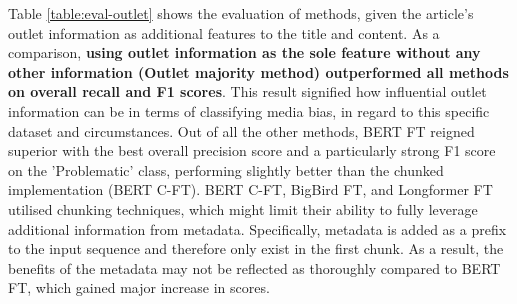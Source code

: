 Table \ref{table:eval-outlet} shows the evaluation of methods, given the article's outlet information as additional features to the title and content. As a comparison, \textbf{using outlet information as the sole feature without any other information (Outlet majority method) outperformed all methods on overall recall and F1 scores}. This result signified how influential outlet information can be in terms of classifying media bias, in regard to this specific dataset and circumstances. Out of all the other methods, BERT FT reigned superior with the best overall precision score and a particularly strong F1 score on the 'Problematic' class, performing slightly better than the chunked implementation (BERT C-FT). BERT C-FT, BigBird FT, and Longformer FT utilised chunking techniques, which might limit their ability to fully leverage additional information from metadata. Specifically, metadata is added as a prefix to the input sequence and therefore only exist in the first chunk. As a result, the benefits of the metadata may not be reflected as thoroughly compared to BERT FT, which gained major increase in scores.




